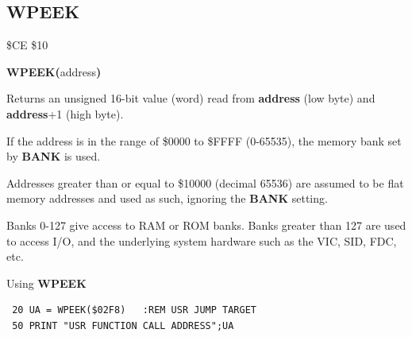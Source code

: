 \subsection{WPEEK}
\begin{description}[leftmargin=2cm,style=nextline]
\item [Token:] \$CE \$10
\item [Format:] {\bf WPEEK(}address{\bf)}
\item [Usage:]  Returns an unsigned 16-bit value (word)
                read from {\bf address} (low byte) and {\bf address}+1 (high byte).

                If the address is in the range of \$0000 to \$FFFF (0-65535), the
                memory bank set by {\bf BANK} is used.

                Addresses greater than or equal to \$10000 (decimal 65536) are assumed to be flat memory
                addresses and used as such, ignoring the {\bf BANK} setting.


\item [Remarks:] Banks 0-127 give access to RAM or ROM banks.
                 Banks greater than 127 are used to access I/O,
                  and the underlying system hardware such as the
                 VIC, SID, FDC, etc.
\item [Example:] Using {\bf WPEEK}

\begin{tcolorbox}[colback=black,coltext=white]
\verbatimfont{\codefont}
\begin{verbatim}
 20 UA = WPEEK($02F8)   :REM USR JUMP TARGET
 50 PRINT "USR FUNCTION CALL ADDRESS";UA
\end{verbatim}
\end{tcolorbox}
\end{description}


\newpage
